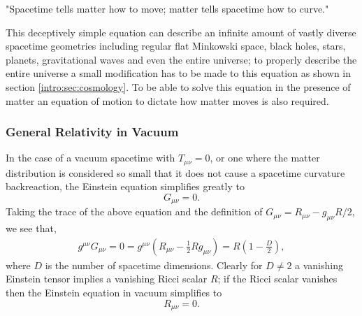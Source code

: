 {\it \begin{center}{"Spacetime tells matter how to move; matter tells spacetime how to curve."}\end{center} } 

This deceptively simple equation can describe an infinite amount of vastly diverse spacetime geometries including regular flat Minkowski space, black holes, stars, planets, gravitational waves and even the entire universe; to properly describe the entire universe a small modification has to be made to this equation as shown in section \ref{intro:sec:cosmology}. 
To be able to solve this equation in the presence of matter an equation of motion to dictate how matter moves is also required. 



\subsubsection*{General Relativity in Vacuum}

In the case of a vacuum spacetime with $T_{\mu\nu}=0$, or one where the matter distribution is considered so small that it does not cause a spacetime curvature backreaction, the Einstein equation simplifies greatly to
\begin{equation}G_{\mu\nu}=0.\end{equation}
Taking the trace of the above equation and the definition of $G_{\mu\nu}=R_{\mu\nu}-g_{\mu\nu}R/2$, we see that, 
\begin{align}
g^{\mu\nu}G_{\mu\nu}=0=g^{\mu\nu}(R_{\mu\nu}-\frac{1}{2}Rg_{\mu\nu}) = R(1-\frac{D}{2}),
\end{align}
where $D$ is the number of spacetime dimensions. Clearly for $D\neq 2$ a vanishing Einstein tensor implies a vanishing Ricci scalar $R$; if the Ricci scalar vanishes then the Einstein equation in vacuum simplifies to 
\begin{equation}
R_{\mu\nu} = 0.
\end{equation}







